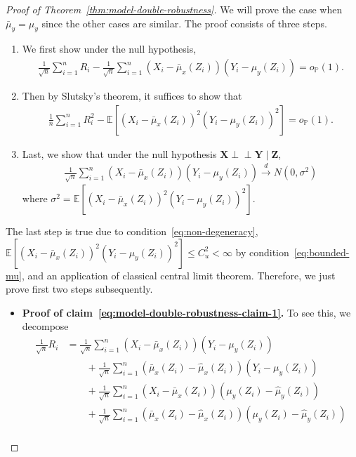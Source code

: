 \documentclass[12pt]{article}
\theoremstyle{definition}
\newcommand{\indep}{\perp \!\!\! \perp}
\def\P{\mathbb{P}}
\def\P{\mathbb{P}}
\newcommand{\E}{\mathbb E}								%
\renewcommand{\P}{\mathbb{P}}							%
\newcommand{\convd}{\overset d \rightarrow}             %
\newcommand{\prx}{\bm X}								%
\newcommand{\srx}{X}									%
\newcommand{\prz}{\bm Z}								%
\newcommand{\srz}{Z}									%
\newcommand{\pry}{{\bm Y}}								%
\newcommand{\sry}{Y}									%
\begin{document}
\begin{proof}[Proof of Theorem~\ref{thm:model-double-robustness}]
	We will prove the case when $\bar \mu_y=\mu_y$ since the other cases are similar. The proof consists of three steps.
	\begin{enumerate}
		\item We first show under the null hypothesis,
		\begin{align}\label{eq:model-double-robustness-claim-1}
			\frac{1}{\sqrt{n}}\sum_{i=1}^n R_i-\frac{1}{\sqrt{n}}\sum_{i=1}^n (\srx_i-\bar \mu_x(\srz_i))(\sry_i-\mu_y(\srz_i))=o_\P(1).
		\end{align}
		\item Then by Slutsky's theorem, it suffices to show that 
		\begin{align}\label{eq:model-double-robustness-claim-2}
			\frac{1}{n}\sum_{i=1}^n R_i^2-\E[(\srx_i-\bar\mu_x(\srz_i))^2(\sry_i-\mu_y(\srz_i))^2]=o_\P(1).
		\end{align}
		\item Last, we show that under the null hypothesis $\prx\indep\pry\mid\prz$,
		\begin{align*}
			\frac{1}{\sqrt{n}}\sum_{i=1}^n (\srx_i-\bar \mu_x(\srz_i))(\sry_i-\mu_y(\srz_i))\convd N(0,\sigma^2)
		\end{align*}
		where $\sigma^2=\E[(\srx_i-\bar\mu_x(\srz_i))^2(\sry_i-\mu_y(\srz_i))^2]$.
	\end{enumerate}
	The last step is true due to condition~\eqref{eq:non-degeneracy}, $\E[(\srx_i-\bar\mu_x(\srz_i))^2(\sry_i-\mu_y(\srz_i))^2]\leq C_u^2<\infty$ by condition~\eqref{eq:bounded-mu},  and an application of classical central limit theorem. Therefore, we just prove first two steps subsequently.
	\begin{itemize}
		\item \textbf{Proof of claim~\eqref{eq:model-double-robustness-claim-1}.} To see this, we decompose 
		\begin{align*}
			\frac{1}{\sqrt{n}}R_i
			&
			=\frac{1}{\sqrt{n}}\sum_{i=1}^n (\srx_i-\bar \mu_x(\srz_i))(\sry_i-\mu_y(\srz_i))\\
			&
			\qquad+\frac{1}{\sqrt{n}}\sum_{i=1}^n (\bar \mu_x(\srz_i)-\widehat{\mu}_x(\srz_i))(\sry_i-\mu_y(\srz_i))\\
			&
			\qquad+\frac{1}{\sqrt{n}}\sum_{i=1}^n (\srx_i-\bar\mu_x(\srz_i))(\mu_y(\srz_i)-\widehat\mu_y(\srz_i))\\
			&
			\qquad+\frac{1}{\sqrt{n}}\sum_{i=1}^n (\bar \mu_x(\srz_i)-\widehat{\mu}_x(\srz_i))(\mu_y(\srz_i)-\widehat\mu_y(\srz_i))\\

\end{align*}
\end{itemize}
\end{proof}
\end{document}
